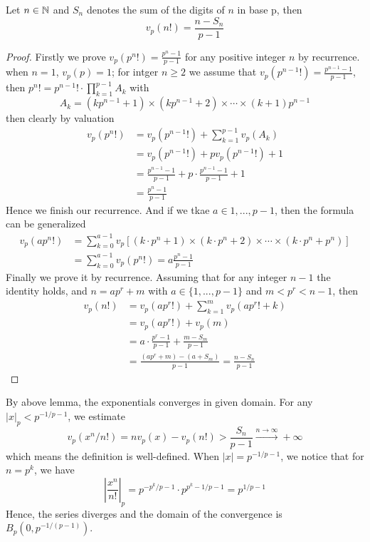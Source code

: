 \begin{lemma}
    Let \(n \in \mathbb{N}\) and \(S_n\) denotes the sum of the digits of \(n\) in base p, then 
    \[v_p(n!) =  \frac{n-S_n}{p-1}\]

    \begin{proof}
        Firstly we prove \(v_p(p^n!) = \frac{p^n-1}{p-1}\) for any positive integer \(n\) by recurrence. when \(n=1\), \(v_p(p) = 1\); for intger \(n \geq 2\) we assume that \(v_p(p^{n-1}!) = \frac{p^{n-1}-1}{p-1}\), then \(p^n! = p^{n-1}! \cdot \prod_{k=1}^{p-1} A_k\) with
        \[A_k = (kp^{n-1}+1) \times (kp^{n-1}+2)\times \cdots \times (k+1)p^{n-1}\]
        then clearly by valuation
        \begin{align*}
            v_p(p^n !) &= v_p(p^{n-1}!) + \sum_{k=1}^{p-1}v_p(A_k)\\
            &= v_p(p^{n-1}!) + pv_p(p^{n-1}!)+1 \\
            &= \frac{p^{n-1}-1}{p-1}+p\cdot \frac{p^{n-1}-1}{p-1} +1 \\
            &= \frac{p^{n}-1}{p-1}
        \end{align*}
        Hence we finish our recurrence. And if we tkae \(a \in {1,...,p-1}\), then the formula can be generalized
        \begin{align*}
            v_p(ap^n !) &= \sum_{k=0}^{a-1}v_p[(k\cdot p^n +1)\times(k\cdot p^n +2) \times \cdots \times  (k\cdot p^n + p^n)] \\
            &= \sum_{k=0}^{a-1}v_p(p^n!) = a\frac{p^n-1}{p-1}
        \end{align*}
        Finally we prove it by recurrence. Assuming that for any integer \(n-1\) the identity holds, and \(n= ap^r+m\) with \(a \in \{1,...,p-1\} \) and \(m<p^r<n-1\), then
        \begin{align*}
            v_p(n!) &= v_p(ap^r!)+\sum_{k=1}^{m}v_p(ap^r!+k)\\
            &= v_p(ap^r!)+v_p(m) \\
            &= a\cdot \frac{p^r-1}{p-1}+\frac{m-S_m}{p-1}\\
            &= \frac{(ap^r+m)-(a+S_m)}{p-1} = \frac{n-S_n}{p-1}
        \end{align*}
    \end{proof}
\end{lemma}

By above lemma, the exponentials converges in given domain. For any \(|x|_p < p^{-1/p-1}\), we estimate
\[v_p(x^n/n!) = nv_p(x)-v_p(n!) > \frac{S_n}{p-1} \xrightarrow{n \rightarrow \infty} +\infty\]
which means the definition is well-defined. When \(|x| = p^{-1/p-1}\), we notice that for \(n = p^k\), we have
\[|\frac{x^n}{n!}|_p  = p^{-p^k/p-1}\cdot p^{p^k-1/p-1} = p^{1/p-1} \]
Hence, the series diverges and the domain of the convergence is \(B_p(0,p^{-1/(p-1)})\). 
\newline


